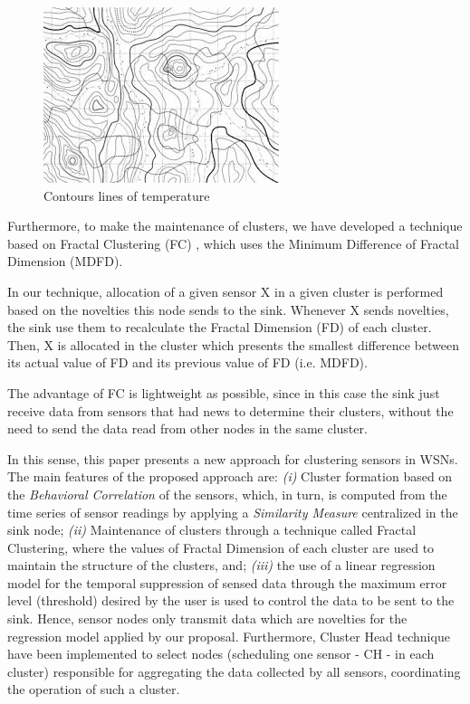 \documentclass{acm_proc_article-sp}
\begin{document}
\begin{figure}[!htb]
\centering
	\includegraphics[scale=0.9]{I2.png}
    \caption{Contours lines of temperature}
    \label{fig:contour_lines}
\end{figure}

Furthermore, to make the maintenance of clusters, we have developed a technique
based on Fractal Clustering (FC) \cite{Barbara1999}, which uses the Minimum
Difference of Fractal Dimension (MDFD). 

In our technique, allocation of a given sensor X in a given cluster is performed
based on the novelties this node sends to the sink. Whenever X sends novelties,
the sink use them to recalculate the Fractal Dimension (FD) of each cluster.
Then, X is allocated in the cluster which presents the smallest difference
between its actual value of FD and its previous value of FD (i.e. MDFD).


The advantage of FC is lightweight as possible, since in this case the sink just
receive data from sensors that had news to determine their clusters, without the
need to send the data read from other nodes in the same cluster.

In this sense, this paper presents a new approach for clustering sensors in
WSNs. The main features of the proposed approach are: {\it (i)} Cluster
formation based on the \textit{Behavioral Correlation} of the sensors, which, in
turn, is computed from the time series of sensor readings by applying a
\textit{Similarity Measure} centralized in the sink node; {\it (ii)} Maintenance
of clusters through a technique called Fractal Clustering, where the values of
Fractal Dimension of each cluster are used to maintain the structure of the
clusters, and; {\it (iii)} the use of a linear regression model for the temporal
suppression of sensed data through the maximum error level (threshold) desired
by the user is used to control the data to be sent to the sink. Hence, sensor
nodes only transmit data which are novelties for the regression model applied by
our proposal. Furthermore, Cluster Head technique have been implemented to
select nodes (scheduling one sensor - CH - in each cluster) responsible for
aggregating the data collected by all sensors, coordinating the operation of
such a cluster.
\end{document}
